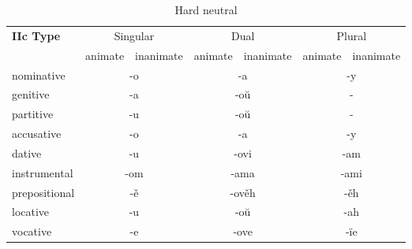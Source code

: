 \begin{table}[!htb]
	\caption{Hard neutral}
	\begin{tabular}{lllllll}
		\textbf{IIc Type}       
		& \multicolumn{2}{c}{Singular} 
		& \multicolumn{2}{c}{Dual} 
		& \multicolumn{2}{c}{Plural} \\
		& \gls{animate}   & \gls{inanimate}  & \gls{animate}   & \gls{inanimate}   & \gls{animate}  & \gls{inanimate} \\
		\gls{nominative}    & \multicolumn{2}{c}{-o}      
		& \multicolumn{2}{c}{-a}        
		& \multicolumn{2}{c}{-y} \\
		\gls{genitive}      & \multicolumn{2}{c}{-a}       
		& \multicolumn{2}{c}{-oŭ}      
		& \multicolumn{2}{c}{-}   \\
		\gls{partitive}     & \multicolumn{2}{c}{-u}       
		& \multicolumn{2}{c}{-oŭ}      
		& \multicolumn{2}{c}{-} \\
		\gls{accusative}    & \multicolumn{2}{c}{-o}     
		& \multicolumn{2}{c}{-a} 
		& \multicolumn{2}{c}{-y} \\
		\gls{dative}        & \multicolumn{2}{c}{-u}       
		& \multicolumn{2}{c}{-ovi}     
		& \multicolumn{2}{c}{-am} \\
		\gls{instrumental}  & \multicolumn{2}{c}{-om}     
		& \multicolumn{2}{c}{-ama}     
		& \multicolumn{2}{c}{-ami} \\
		\gls{prepositional} & \multicolumn{2}{c}{-ě}       
		& \multicolumn{2}{c}{-ověh}     
		& \multicolumn{2}{c}{-ěh} \\
		\gls{locative}      & \multicolumn{2}{c}{-u}      
		& \multicolumn{2}{c}{-oŭ}       
		& \multicolumn{2}{c}{-ah} \\ 
		\gls{vocative}      & \multicolumn{2}{c}{-e}       
		& \multicolumn{2}{c}{-ove}      
		& \multicolumn{2}{c}{-ïe}
	\end{tabular}
\end{table}

